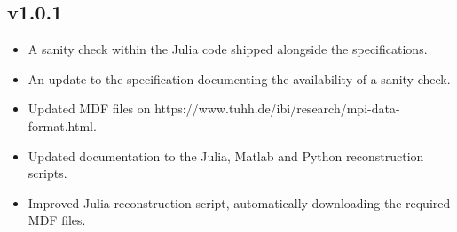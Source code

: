 \documentclass[landscape,a4paper]{article} %
\begin{document}
\begin{multicols}{2}
\subsection{v1.0.1}

\begin{itemize}
	\item A sanity check within the Julia code shipped alongside the specifications.
	\item An update to the specification documenting the availability of a sanity check.
	\item Updated MDF files on https://www.tuhh.de/ibi/research/mpi-data-format.html.
	\item Updated documentation to the Julia, Matlab and Python reconstruction scripts.
	\item Improved Julia reconstruction script, automatically downloading the required MDF files.
\end{itemize}
\end{multicols}




\end{document}
